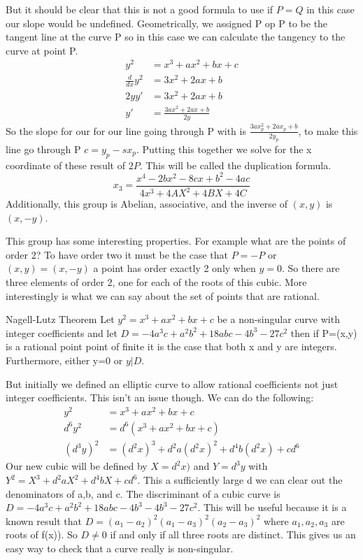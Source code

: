 \documentclass{article}
\begin{document}
But it should be clear that this is not a good formula to use if $P = Q$ in this case our slope would be undefined. Geometrically, we assigned P op P to be the tangent line at the curve P so in this case we can calculate the tangency to the curve at point P. 
\begin{align}
    y^2 &= x^3 + ax^2 + bx + c \\
    \frac{d}{dx} y^2 &= 3x^2 + 2ax + b \\
    2 y y' &= 3x^2 + 2ax + b \\
    y' &= \frac{3ax^2 + 2ax + b}{2y}
\end{align}
So the slope for our for our line going through P with is $\frac{3ax_p^2 + 2ax_p + b}{2y_p}$, to make this line go through P $c  = y_p - s x_p$. Putting this together we solve for the x coordinate of these result of $2P$. This will be called the duplication formula. 
\begin{equation}
    \tag{Duplication formula}
    x_3 = \frac{x^4 - 2bx^2 - 8cx + b^2 - 4ac}{4x^3 + 4AX^2 + 4BX + 4C}
\end{equation}
Additionally, this group is Abelian, associative, and the inverse of $(x, y)$ is $(x, -y)$. 


This group has some interesting properties. For example what are the points of order 2? To have order two it must be the case that $P = -P$ or $(x,y) = (x, -y)$ a point has order exactly 2 only when  $y = 0$. So there are three elements of order 2, one for each of the roots of this cubic. More interestingly is what we can say about the set of points that are rational. 
\begin{theorem}{Nagell-Lutz Theorem}
    Let $y^2 = x^3 + ax^2 + bx + c$ be a non-singular curve with integer coefficients and let $D = -4a^3c + a^2b^2 + 18abc - 4b^3 - 27c^2$ then if P=(x,y) is a rational point point of finite it is the case that both x and y are integers. Furthermore, either y=0 or $ y | D$.
\end{theorem}
But initially we defined an elliptic curve to allow rational coefficients not just integer coefficients. This isn't an issue though. We can do the following:
\begin{align}
    y^2 &= x^3 + ax^2 + bx + c \\
    d^6 y^2 &= d^6( x^3 + ax^2 + bx + c) \\
    (d^3 y)^2 &= (d^2 x)^3 + d^2 a ( d^2 x)^2 + d^4 b ( d^2 x) + c d^6
\end{align}
Our new cubic will be defined by $X = d^2 x)$ and $Y = d^3 y$ with $Y^2 = X^3 + d^2 a X^2 + d^4 b X + c d^6$. This a sufficiently large d we can clear out the denominators of a,b, and c. 
The  discriminant of a cubic curve is $D = -4a^3 c + a^2 b^2 + 18abc - 4b^3 - 4b^3 - 27c^2$. This will be useful because it is a known result that $D = (a_1 - a_2)^2 ( a_1 - a_3)^2 (a_2 - a_3)^2$ where $a_1, a_2, a_3$ are roots of f(x)\cite{silverman1992rational}). So $D \neq 0 $ if and only if all three roots are distinct.  This gives us an easy way to check that a curve really is non-singular. 
\end{document}
